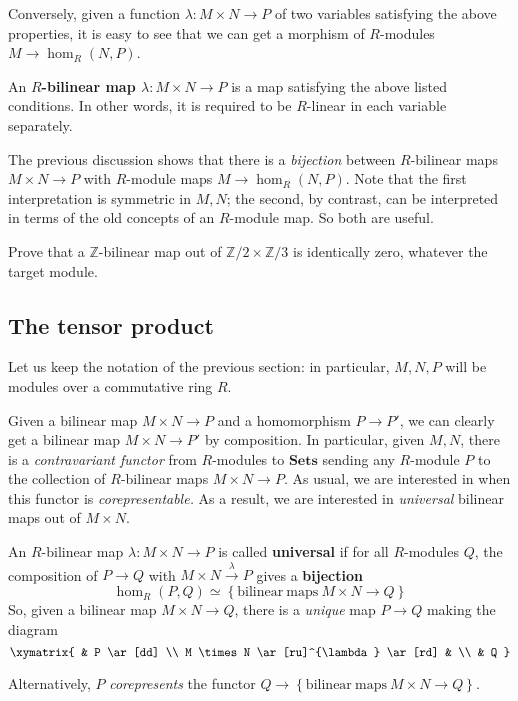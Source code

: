 Conversely, given a function $\lambda: M \times N \to P$ of two variables satisfying the above properties,
it is easy to see that we can get a morphism of $R$-modules $M \to
\hom_R(N,P)$.



\begin{definition}
An \textbf{$R$-bilinear map $\lambda: M \times N \to P$} is a map satisfying
the above listed conditions. In other words, it is required to be $R$-linear
in each variable separately.
\end{definition}

The previous discussion shows that there is a \emph{bijection} between $R$-bilinear
maps $M \times N \to P$ with $R$-module maps $M \to \hom_R(N,P)$.
Note that the first interpretation is symmetric in $M,N$; the second, by
contrast, can be interpreted in terms of the old concepts of an $R$-module map.
So both are useful.

\begin{exercise}
Prove that a $\mathbb{Z}$-bilinear map out of $\mathbb{Z}/2 \times
\mathbb{Z}/3$ is identically zero, whatever the target module.
\end{exercise}

\subsection{The tensor product}

Let us keep the notation of the previous section: in particular, $M,N, P$ will
be modules over a commutative ring $R$.

Given a bilinear map $M \times N \to P$ and a homomorphism $P \to P'$, we can
clearly get a bilinear map $M \times N \to P'$ by composition.
In particular, given $M,N$, there is a \emph{contravariant functor} from
$R$-modules to
$\mathbf{Sets}$ sending  any $R$-module $P$ to the collection of $R$-bilinear
maps $M \times N
\to P$. As usual, we are interested in when this functor is
\emph{corepresentable.}
As  a result,
we are interested in \emph{universal} bilinear maps out of $M \times N$.


\begin{definition}
An $R$-bilinear map $\lambda: M \times N \to P$ is called \textbf{universal} if
for all $R$-modules $Q$, the composition of $P \to Q$ with $M \times N
\stackrel{\lambda}{\to} P$
gives a \textbf{bijection}
\[ \hom_R(P,Q) \simeq \left\{\mathrm{bilinear \ maps} \ M \times N \to
Q\right\}  \]
So, given a bilinear map $M \times N \to Q$, there is a \textit{unique} map $P
\to Q$ making the diagram
\[
\xymatrix{
& P \ar[dd] \\
M \times N \ar[ru]^{\lambda} \ar[rd] & \\
& Q
}
\]

Alternatively, $P$ \emph{corepresents} the functor $Q \to
\left\{\mathrm{bilinear \ maps \ } M \times N \to Q\right\}$.
\end{definition}

